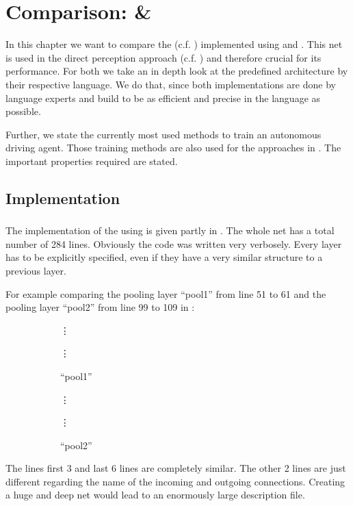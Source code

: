 \chapter{Comparison: \cnnarch \& \caffe}\label{chapter: Comparison}

In this chapter we want to compare the \alexnet (c.f. ) implemented using \cnnarch and \caffe. This net is used in the direct perception approach (c.f. ) and therefore crucial for its performance. For both we take an in depth look at the predefined architecture by their respective language. We do that, since both implementations are done by language experts and build to be as efficient and precise in the language as possible.

Further, we state the currently most used methods to train an autonomous driving agent. Those training methods are also used for the approaches in . The important properties required are stated.


\section{Implementation} \label{sec: Implementation}

\subsection{\caffe} \label{subsec: Caffe Implementation}
The implementation of the \alexnet using \caffe is given partly in . The whole net has a total number of 284 lines. Obviously the code was written very verbosely. Every layer has to be explicitly specified, even if they have a very similar structure to a previous layer.

For example comparing the pooling layer ``pool1'' from line 51 to 61 and the pooling layer ``pool2'' from line 99 to 109 in :
\begin{figure}[H]
	\centering
	\begin{subfigure}[b]{0.45\textwidth}
		\hspace*{2cm}\vdots
		
		\hspace*{2cm}\vdots
		\caption{``pool1''}
		\label{lst: pool1}
	\end{subfigure}
	\begin{subfigure}[b]{0.45\textwidth}
		\hspace*{2cm}\vdots
		
		\hspace*{2cm}\vdots
		\caption{``pool2''}
		\label{lst: pool2}
	\end{subfigure}
	\caption{}
	\label{lst: pool1 and pool2}
\end{figure}
The lines first 3 and last 6 lines are completely similar. The other 2 lines are just different regarding the name of the incoming and outgoing connections. Creating a huge and deep net would lead to an enormously large description file. 

